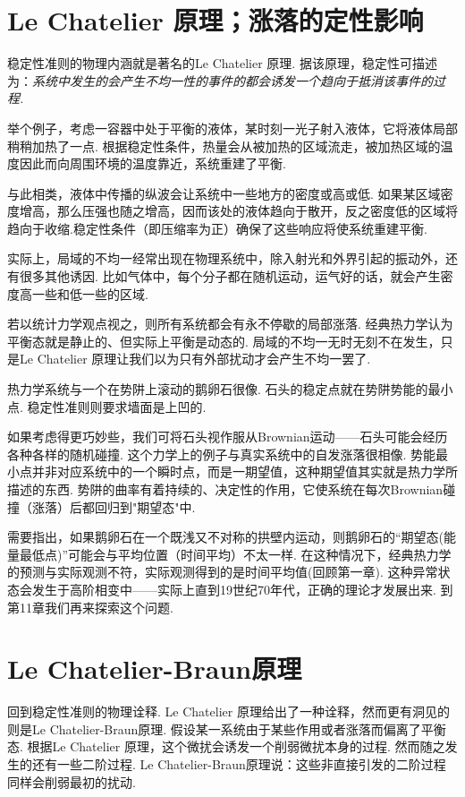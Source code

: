 \section{Le Chatelier 原理；涨落的定性影响}
\label{sec8.4}
稳定性准则的物理内涵就是著名的Le Chatelier 原理. 据该原理，稳定性可描述为：\textsl{系统中发生的会产生不均一性的事件的都会诱发一个趋向于抵消该事件的过程.}

举个例子，考虑一容器中处于平衡的液体，某时刻一光子射入液体，它将液体局部稍稍加热了一点. 根据稳定性条件，热量会从被加热的区域流走，被加热区域的温度因此而向周围环境的温度靠近，系统重建了平衡.

与此相类，液体中传播的纵波会让系统中一些地方的密度或高或低. 如果某区域密度增高，那么压强也随之增高，因而该处的液体趋向于散开，反之密度低的区域将趋向于收缩.稳定性条件（即压缩率为正）确保了这些响应将使系统重建平衡.

实际上，局域的不均一经常出现在物理系统中，除入射光和外界引起的振动外，还有很多其他诱因. 比如气体中，每个分子都在随机运动，运气好的话，就会产生密度高一些和低一些的区域.

若以统计力学观点视之，则所有系统都会有永不停歇的局部涨落. 经典热力学认为平衡态就是静止的、但实际上平衡是动态的. 局域的不均一无时无刻不在发生，只是Le Chatelier 原理让我们以为只有外部扰动才会产生不均一罢了.

热力学系统与一个在势阱上滚动的鹅卵石很像. 石头的稳定点就在势阱势能的最小点. 稳定性准则则要求墙面是上凹的.

如果考虑得更巧妙些，我们可将石头视作服从Brownian运动——石头可能会经历各种各样的随机碰撞. 这个力学上的例子与真实系统中的自发涨落很相像. 势能最小点并非对应系统中的一个瞬时点，而是一期望值，这种期望值其实就是热力学所描述的东西. 势阱的曲率有着持续的、决定性的作用，它使系统在每次Brownian碰撞（涨落）后都回归到"期望态"中.

需要指出，如果鹅卵石在一个既浅又不对称的拱壁内运动，则鹅卵石的“期望态(能量最低点)”可能会与平均位置（时间平均）不太一样. 在这种情况下，经典热力学的预测与实际观测不符，实际观测得到的是时间平均值(回顾第一章). 这种异常状态会发生于高阶相变中——实际上直到19世纪70年代，正确的理论才发展出来. 到第11章我们再来探索这个问题.

\section{Le Chatelier-Braun原理}
\label{sec8.5}
回到稳定性准则的物理诠释. Le Chatelier 原理给出了一种诠释，然而更有洞见的则是Le Chatelier-Braun原理.
假设某一系统由于某些作用或者涨落而偏离了平衡态. 根据Le Chatelier 原理，这个微扰会诱发一个削弱微扰本身的过程. 然而随之发生的还有一些二阶过程. Le Chatelier-Braun原理说：这些非直接引发的二阶过程同样会削弱最初的扰动.

